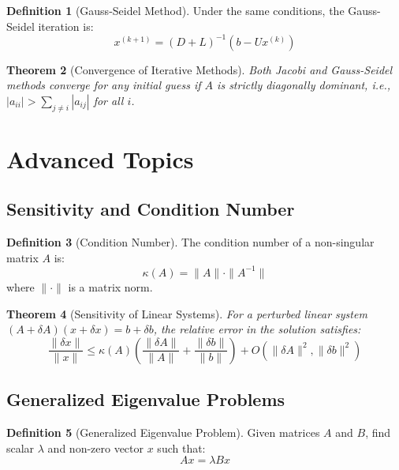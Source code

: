\documentclass[12pt,a4paper]{article}
\theoremstyle{plain}
\newtheorem{theorem}{Theorem}[section]
\theoremstyle{definition}
\newtheorem{definition}[theorem]{Definition}
\begin{document}
\begin{definition}[Gauss-Seidel Method]
Under the same conditions, the Gauss-Seidel iteration is:
\begin{equation}
x^{(k+1)} = (D + L)^{-1}(b - Ux^{(k)})
\end{equation}
\end{definition}

\begin{theorem}[Convergence of Iterative Methods]
Both Jacobi and Gauss-Seidel methods converge for any initial guess if $A$ is strictly diagonally dominant, i.e., $|a_{ii}| > \sum_{j \neq i} |a_{ij}|$ for all $i$.
\end{theorem}

\section{Advanced Topics}

\subsection{Sensitivity and Condition Number}

\begin{definition}[Condition Number]
The condition number of a non-singular matrix $A$ is:
\begin{equation}
\kappa(A) = \|A\| \cdot \|A^{-1}\|
\end{equation}
where $\|\cdot\|$ is a matrix norm.
\end{definition}

\begin{theorem}[Sensitivity of Linear Systems]
For a perturbed linear system $(A + \delta A)(x + \delta x) = b + \delta b$, the relative error in the solution satisfies:
\begin{equation}
\frac{\|\delta x\|}{\|x\|} \leq \kappa(A) \left( \frac{\|\delta A\|}{\|A\|} + \frac{\|\delta b\|}{\|b\|} \right) + O(\|\delta A\|^2, \|\delta b\|^2)
\end{equation}
\end{theorem}

\subsection{Generalized Eigenvalue Problems}

\begin{definition}[Generalized Eigenvalue Problem]
Given matrices $A$ and $B$, find scalar $\lambda$ and non-zero vector $x$ such that:
\begin{equation}
Ax = \lambda Bx
\end{equation}
\end{definition}
\end{document}

